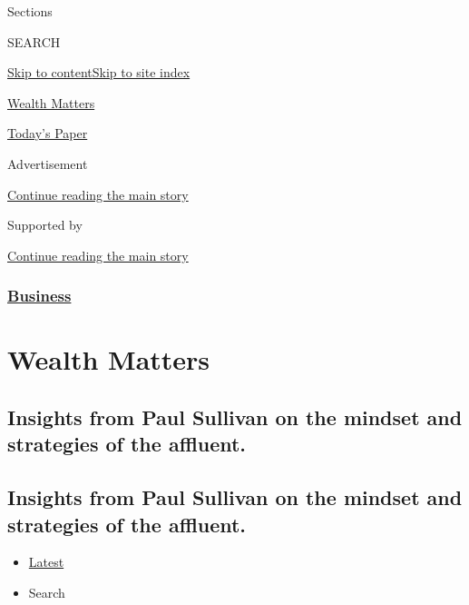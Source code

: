 Sections

SEARCH

\protect\hyperlink{site-content}{Skip to
content}\protect\hyperlink{site-index}{Skip to site index}

\href{https://www.nytimes3xbfgragh.onion/column/wealth-matters}{Wealth
Matters}

\href{https://myaccount.nytimes3xbfgragh.onion/auth/login?response_type=cookie\&client_id=vi}{}

\href{https://www.nytimes3xbfgragh.onion/section/todayspaper}{Today's
Paper}

Advertisement

\protect\hyperlink{after-top}{Continue reading the main story}

Supported by

\protect\hyperlink{after-sponsor}{Continue reading the main story}

\hypertarget{business}{%
\subsubsection{\texorpdfstring{\href{/section/business}{Business}}{Business}}\label{business}}

\hypertarget{wealth-matters}{%
\section{Wealth Matters}\label{wealth-matters}}

\hypertarget{insights-from-paul-sullivan-on-the-mindset-and-strategies-of-the-affluent}{%
\subsection{Insights from Paul Sullivan on the mindset and strategies of
the
affluent.}\label{insights-from-paul-sullivan-on-the-mindset-and-strategies-of-the-affluent}}

\hypertarget{insights-from-paul-sullivan-on-the-mindset-and-strategies-of-the-affluent-1}{%
\subsection{Insights from Paul Sullivan on the mindset and strategies of
the
affluent.}\label{insights-from-paul-sullivan-on-the-mindset-and-strategies-of-the-affluent-1}}

\begin{itemize}
\tightlist
\item
  \protect\hyperlink{stream-panel}{Latest}
\item
  Search
\end{itemize}

